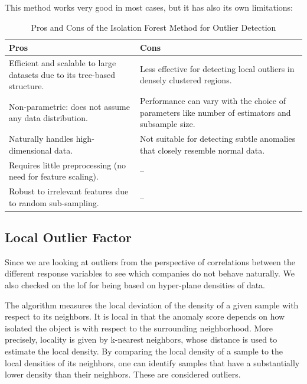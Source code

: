 \documentclass[11pt,english,a4paper,hidelinks]{book}
\begin{document}
\noindent This method works very good in most cases, but it has also its own limitations:

\begin{table}[H]
    \centering
    \begin{tabular}{|p{7cm}|p{7cm}|}
    \hline
    \textbf{Pros} & \textbf{Cons} \\
    \hline
    Efficient and scalable to large datasets due to its tree-based structure. & Less effective for detecting local outliers in densely clustered regions. \\
    \hline
    Non-parametric: does not assume any data distribution. & Performance can vary with the choice of parameters like number of estimators and subsample size. \\
    \hline
    Naturally handles high-dimensional data. & Not suitable for detecting subtle anomalies that closely resemble normal data. \\
    \hline
    Requires little preprocessing (no need for feature scaling). & -- \\
    \hline
    Robust to irrelevant features due to random sub-sampling. & -- \\
    \hline
    \end{tabular}
    \caption{Pros and Cons of the Isolation Forest Method for Outlier Detection}
\end{table}

\subsection{Local Outlier Factor}

Since we are looking at outliers from the perspective of correlations between the different response variables to see which companies do not behave naturally. We also checked on the \gls{lof} for being based on hyper-plane densities of data.

\vspace{0.5cm}
\noindent The algorithm measures the local deviation of the density of a given sample with respect to its neighbors. It is local in that the anomaly score depends on how isolated the object is with respect to the surrounding neighborhood. More precisely, locality is given by k-nearest neighbors, whose distance is used to estimate the local density. By comparing the local density of a sample to the local densities of its neighbors, one can identify samples that have a substantially lower density than their neighbors. These are considered outliers. \textcite{breunig2000lof}
\end{document}
